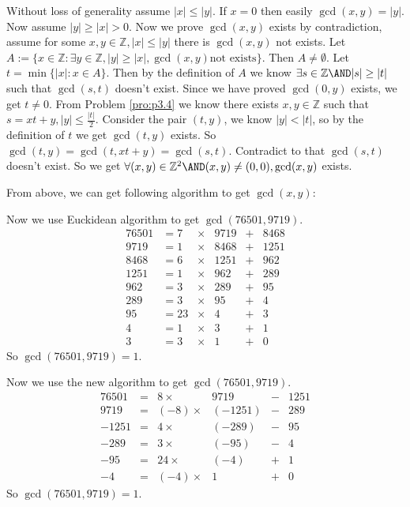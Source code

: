 \documentclass{ctexart}
\begin{document}
\begin{solution}
  Without loss of generality assume \(|x| \leq |y|\). If \(x=0\) then easily \(\gcd(x,y)=|y|\).
  Now assume \(|y| \geq |x| >0\). Now we prove \(\gcd(x,y)\) exists by contradiction, assume for some \(x,y \in \mathbb{Z},|x|\leq|y|\) there is \(\gcd(x,y)\) not exists.
  Let \(A:=\{x \in \mathbb{Z}:\exists y \in \mathbb{Z},|y| \geq |x|,\gcd(x,y) \text{not exists}\}\).
  Then \(A \neq \emptyset\). Let \(t = \min\{|x|:x \in A\}\). Then by the definition of \(A\) we know \(\exists s \in \mathbb{Z} \AND |s| \geq |t|\) such that \(\gcd(s,t)\) doesn't exist.
  Since we have proved \(\gcd(0,y)\) exists, we get \(t \neq 0\).
  From Problem \ref{pro:p3.4} we know there exists \(x,y \in \mathbb{Z}\) such that \(s=xt+y,|y| \leq \frac{|t|}{2}\).
  Consider the pair \((t,y)\), we know \(|y|< |t|\), so by the definition of \(t\) we get \(\gcd(t,y)\) exists.
  So \(\gcd(t,y)=\gcd(t,xt+y)=\gcd(s,t)\). Contradict to that \(\gcd(s,t)\) doesn't exist.
  So we get \(\forall(x,y) \in \mathbb{Z}^2 \AND (x,y)\neq (0,0),\gcd(x,y)\) exists.

  From above, we can get following algorithm to get \(\gcd(x,y)\):
  

  Now we use Euckidean algorithm to get \(\gcd(76501,9719)\).
  \[
    \begin{aligned}
      76501 & = 7  & \times & 9719 & + & 8468 \\
      9719  & = 1  & \times & 8468 & + & 1251 \\
      8468  & = 6  & \times & 1251 & + & 962  \\
      1251  & = 1  & \times & 962  & + & 289  \\
      962   & = 3  & \times & 289  & + & 95   \\
      289   & =3   & \times & 95   & + & 4    \\
      95    & = 23 & \times & 4    & + & 3    \\
      4     & = 1  & \times & 3    & + & 1    \\
      3     & = 3  & \times & 1    & + & 0
    \end{aligned}
  \]
  So \(\gcd(76501,9719)=1\).

  Now we use the new algorithm to get \(\gcd(76501,9719)\).
  \[
    \begin{aligned}
      76501 & = & 8   \times   & 9719    & - & 1251 \\
      9719  & = & (-8)  \times & (-1251) & - & 289  \\
      -1251 & = & 4   \times   & (-289)  & - & 95   \\
      -289  & = & 3   \times   & (-95)   & - & 4    \\
      -95   & = & 24  \times   & (-4)    & + & 1    \\
      -4    & = & (-4)  \times & 1       & + & 0
    \end{aligned}
  \]
  So \(\gcd(76501,9719)=1\).
\end{solution}
\end{document}
